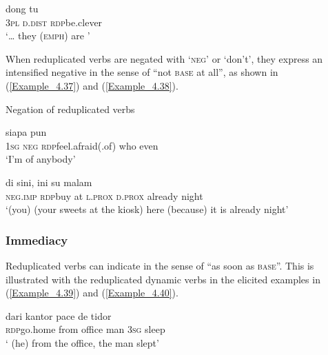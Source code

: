 \ea
\label{Example_4.36}
\gll {\ldots} {dong} {tu} {}\\ %
  { } \textsc{3pl}  \textsc{d.dist}  \textsc{rdp}{\Tilde}be.clever\\
\glt 
‘{\ldots} they (\textsc{emph}) are ’ \textstyleExampleSource{[081109-001-Cv.0117]}
\z


When reduplicated verbs are negated with  ‘\textsc{neg}’ or  ‘don’t’, they express an intensified negative in the sense of ``not \textsc{base} at all'', as shown in (\ref{Example_4.37}) and (\ref{Example_4.38}).


\begin{styleExampleTitle}
Negation of reduplicated verbs
\end{styleExampleTitle}
\ea
\label{Example_4.37}
 {} {} {siapa} {pun}\\ %
 \textsc{1sg}  \textsc{neg}  \textsc{rdp}{\Tilde}feel.afraid(.of)  who  even\\

\glt 
‘I’m  of anybody’ \textstyleExampleSource{[081006-034-CvEx.0026]}
\z

\ea
\label{Example_4.38}
 {} {di} {sini}, {ini} {su} {malam}\\ %
 \textsc{neg.imp}  \textsc{rdp}{\Tilde}buy  at  \textsc{l.prox}  \textsc{d.prox}  already  night\\

\glt
‘(you)  (your sweets at the kiosk) here  (because) it is already night’ \textstyleExampleSource{[080917-008-NP.0061]}
\z


\subsubsection[Immediacy]{Immediacy}\label{Para_4.2.2.4}

Reduplicated verbs can indicate  in the sense of ``as soon as \textsc{base}''. This is illustrated with the reduplicated dynamic verbs in the elicited examples in (\ref{Example_4.39}) and (\ref{Example_4.40}).


\ea
\label{Example_4.39}
 {dari} {kantor} {pace} {de} {tidor}\\ %
 \textsc{rdp}{\Tilde}go.home  from  office  man  \textsc{3sg}  sleep\\
\glt 
‘ (he)  from the office, the man slept’ \textstyleExampleSource{[Elicited BR120813.007]}
\z


